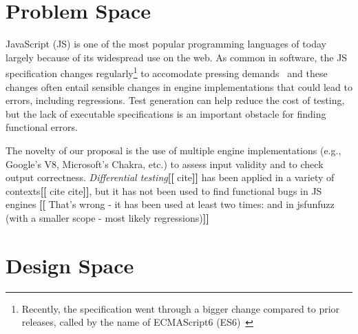 \documentclass[11pt]{article}
\newcommand{\eg}{e.g.}
\newcommand{\Fix}[1]{\textbf{[[}{\color{red} #1}\textbf{]]}}
\newcommand{\MAB}[1]{\textbf{[[}{\color{darkgreen} #1}\textbf{]]}}
\newcommand{\Comment}[1]{}
\begin{document}
\section{Problem Space}



JavaScript (JS) is one of the most popular programming languages of
today~\cite{business-insider,stackify} largely because of its
widespread use on the web. As common in software, the JS specification
changes regularly\footnote{Recently, the specification went through a
  bigger change compared to prior releases, called by the name of
  ECMAScript6 (ES6)~\cite{es6-features}} to accomodate pressing
demands~\cite{kangax} and these changes often entail sensible changes
in engine implementations that could lead to errors, including
regressions.  Test generation can help reduce the cost of testing, but
the lack of executable specifications is an important obstacle for
finding functional errors.  

\begin{center}
\end{center}

The novelty of our proposal is the use of multiple engine
implementations (\eg{}, Google's V8, Microsoft's Chakra, etc.) to
assess input validity and to check output
correctness. \emph{Differential testing}\Fix{cite} has been applied in
a variety of contexts\Fix{cite cite}, but it has not been used to find
functional bugs in JS engines \MAB{That's wrong - it has been used at
  least two times: \cite{patra2016learning} and in jsfunfuzz (with a
  smaller scope - most likely regressions)}

\section{Design Space}
\label{sec:design}
\end{document}
